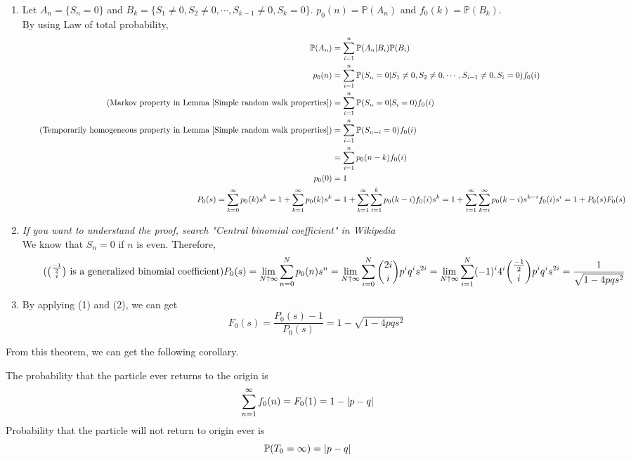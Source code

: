 \documentclass{huhtakm-template-book}
\newcommand{\prob}{\mathbb{P}}
\begin{document}
\begin{proofing}
	\begin{enumerate}
		\item Let $A_{n}=\{S_{n}=0\}$ and $B_{k}=\{S_{1}\neq 0,S_{2}\neq 0,\cdots,S_{k-1}\neq 0,S_{k}=0\}$. $p_{0}(n)=\prob(A_{n})$ and $f_{0}(k)=\prob(B_{k})$.\\
		By using Law of total probability, 
		\begin{align*}
			\prob(A_{n})&=\sum_{i=1}^{n}\prob(A_{n}|B_{i})\prob(B_{i})\\
			p_{0}(n)&=\sum_{i=1}^{n}\prob(S_{n}=0|S_{1}\neq 0,S_{2}\neq 0,\cdots,S_{i-1}\neq 0,S_{i}=0)f_{0}(i)\\
			\tag{Markov property in Lemma \ref{Simple random walk properties}}
			&=\sum_{i=1}^{n}\prob(S_{n}=0|S_{i}=0)f_{0}(i)\\
			\tag{Temporarily homogeneous property in Lemma \ref{Simple random walk properties}}
			&=\sum_{i=1}^{n}\prob(S_{n-i}=0)f_{0}(i)\\
			&=\sum_{i=1}^{n}p_{0}(n-k)f_{0}(i)\\
			p_{0}(0)&=1\\
			P_{0}(s)=\sum_{k=0}^{\infty}p_{0}(k)s^{k}=1+\sum_{k=1}^{\infty}p_{0}(k)s^{k}&=1+\sum_{k=1}^{\infty}\sum_{i=1}^{k}p_{0}(k-i)f_{0}(i)s^{k}=1+\sum_{i=1}^{\infty}\sum_{k=i}^{\infty}p_{0}(k-i)s^{k-i}f_{0}(i)s^{i}=1+P_{0}(s)F_{0}(s)
		\end{align*}
		\item \textit{If you want to understand the proof, search "Central binomial coefficient" in Wikipedia}\\
		We know that $S_{n}=0$ if $n$ is even. Therefore,
		\begin{equation*}
			\tag{$\binom{\frac{-1}{2}}{i}$ is a generalized binomial coefficient}
			P_{0}(s)=\lim_{N\uparrow\infty}\sum_{n=0}^{N}p_{0}(n)s^{n}=\lim_{N\uparrow\infty}\sum_{i=0}^{N}\binom{2i}{i}p^{i}q^{i}s^{2i}=\lim_{N\uparrow\infty}\sum_{i=1}^{N}(-1)^{i}4^{i}\binom{\frac{-1}{2}}{i}p^{i}q^{i}s^{2i}=\frac{1}{\sqrt{1-4pqs^{2}}}
		\end{equation*}
		\item By applying (1) and (2), we can get
		\begin{equation*}
			F_{0}(s)=\frac{P_{0}(s)-1}{P_{0}(s)}=1-\sqrt{1-4pqs^{2}}
		\end{equation*}
	\end{enumerate}
\end{proofing}
From this theorem, we can get the following corollary.
\begin{cor}
	The probability that the particle ever returns to the origin is
	\begin{equation*}
		\sum_{n=1}^{\infty}f_{0}(n)=F_{0}(1)=1-\left|{p-q}\right|
	\end{equation*}
	Probability that the particle will not return to origin ever is
	\begin{equation*}
		\prob(T_{0}=\infty)=\abs{p-q}
	\end{equation*}
\end{cor}
\end{document}
